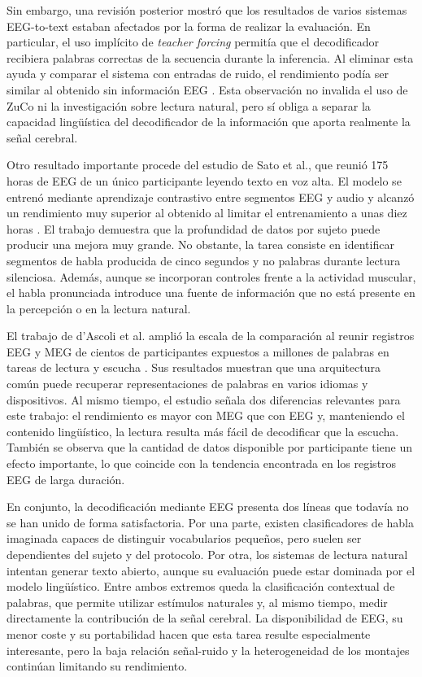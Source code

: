 Sin embargo, una revisión posterior mostró que los resultados de varios sistemas EEG-to-text estaban afectados por la forma de realizar la evaluación. En particular, el uso implícito de \textit{teacher forcing} permitía que el decodificador recibiera palabras correctas de la secuencia durante la inferencia. Al eliminar esta ayuda y comparar el sistema con entradas de ruido, el rendimiento podía ser similar al obtenido sin información EEG \cite{jo2024eegtext}. Esta observación no invalida el uso de ZuCo ni la investigación sobre lectura natural, pero sí obliga a separar la capacidad lingüística del decodificador de la información que aporta realmente la señal cerebral.

Otro resultado importante procede del estudio de Sato et al., que reunió 175 horas de EEG de un único participante leyendo texto en voz alta. El modelo se entrenó mediante aprendizaje contrastivo entre segmentos EEG y audio y alcanzó un rendimiento muy superior al obtenido al limitar el entrenamiento a unas diez horas \cite{sato2024scaling}. El trabajo demuestra que la profundidad de datos por sujeto puede producir una mejora muy grande. No obstante, la tarea consiste en identificar segmentos de habla producida de cinco segundos y no palabras durante lectura silenciosa. Además, aunque se incorporan controles frente a la actividad muscular, el habla pronunciada introduce una fuente de información que no está presente en la percepción o en la lectura natural.

El trabajo de d'Ascoli et al. amplió la escala de la comparación al reunir registros EEG y MEG de cientos de participantes expuestos a millones de palabras en tareas de lectura y escucha \cite{dascoli2024words}. Sus resultados muestran que una arquitectura común puede recuperar representaciones de palabras en varios idiomas y dispositivos. Al mismo tiempo, el estudio señala dos diferencias relevantes para este trabajo: el rendimiento es mayor con MEG que con EEG y, manteniendo el contenido lingüístico, la lectura resulta más fácil de decodificar que la escucha. También se observa que la cantidad de datos disponible por participante tiene un efecto importante, lo que coincide con la tendencia encontrada en los registros EEG de larga duración.

En conjunto, la decodificación mediante EEG presenta dos líneas que todavía no se han unido de forma satisfactoria. Por una parte, existen clasificadores de habla imaginada capaces de distinguir vocabularios pequeños, pero suelen ser dependientes del sujeto y del protocolo. Por otra, los sistemas de lectura natural intentan generar texto abierto, aunque su evaluación puede estar dominada por el modelo lingüístico. Entre ambos extremos queda la clasificación contextual de palabras, que permite utilizar estímulos naturales y, al mismo tiempo, medir directamente la contribución de la señal cerebral. La disponibilidad de EEG, su menor coste y su portabilidad hacen que esta tarea resulte especialmente interesante, pero la baja relación señal-ruido y la heterogeneidad de los montajes continúan limitando su rendimiento.

